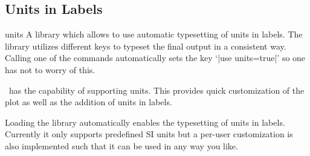 \subsection{Units in Labels}
\label{sec:units}

{}

\begin{pgfplotslibrary}{units}
  A library which allows to use automatic typesetting of units in labels. The library utilizes different keys to typeset the final output in a consistent way.
  Calling one of the commands automatically sets the key `|use units=true|' so one has not to worry of this.
\end{pgfplotslibrary}
\PGFPlots\ has the capability of supporting units. This provides quick customization of the plot as well as the addition of units in labels. 

Loading the library automatically enables the typesetting of units in labels. Currently it only supports predefined SI units but a per-user customization is also
implemented such that it can be used in any way you like.

